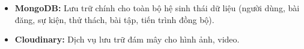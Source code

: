\begin{itemize}
    \item \textbf{MongoDB:} Lưu trữ chính cho toàn bộ hệ sinh thái dữ liệu (người dùng, bài đăng, sự kiện, thử thách, bài tập, tiến trình đồng bộ).
    \item \textbf{Cloudinary:} Dịch vụ lưu trữ đám mây cho hình ảnh, video.
\end{itemize}







